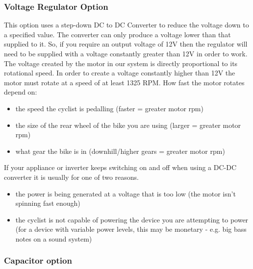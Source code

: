 \documentclass{article}
\theoremstyle{definition}
\theoremstyle{definition}
\theoremstyle{remark}
\begin{document}
    \subsubsection*{Voltage Regulator Option} %
    \label{ssub:voltage_regulator_option}

      This option uses a step-down DC to DC Converter to reduce the voltage down to a specified value. The converter can only produce a voltage lower than that supplied to it. So, if you require an output voltage of 12V then the regulator will need to be supplied with a voltage constantly greater than 12V in order to work. The voltage created by the motor in our system is directly proportional to its rotational speed. In order to create a voltage constantly higher than 12V the motor must rotate at a speed of at least 1325 RPM. How fast the motor rotates depend on:

      \begin{itemize}
        \item the speed the cyclist is pedalling (faster = greater motor rpm)
        \item the size of the rear wheel of the bike you are using (larger = greater motor rpm)
        \item what gear the bike is in (downhill/higher gears = greater motor rpm)
      \end{itemize}

      If your appliance or inverter keeps switching on and off when using a DC-DC converter it is usually for one of two reasons.

      \begin{itemize}
        \item the power is being generated at a voltage that is too low (the motor isn't spinning fast enough)
        \item the cyclist is not capable of powering the device you are attempting to power (for a device with variable power levels, this may be monetary - e.g. big bass notes on a sound system)
      \end{itemize}
    

    \subsubsection*{Capacitor option} %
    \label{ssub:capacitor_option}
\end{document}
